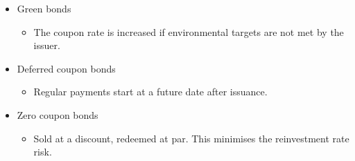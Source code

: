 \documentclass[../notes_compiled.tex]{subfiles}
\begin{document}
\begin{itemize}
\item Green bonds
\begin{itemize}
\item The coupon rate is increased if environmental targets are not met by the issuer.
\end{itemize}
\item Deferred coupon bonds
\begin{itemize}
\item Regular payments start at a future date after issuance.
\end{itemize}
\item Zero coupon bonds
\begin{itemize}
\item Sold at a discount, redeemed at par. This minimises the reinvestment rate risk.
\end{itemize}
\end{itemize}
\end{document}
